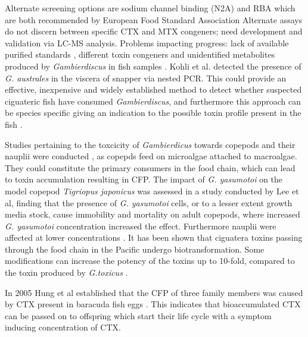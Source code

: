 Alternate screening options are sodium channel binding (N2A) \cite{dickey2010ciguatera} and RBA \cite{poli1997identification,darius2007ciguatera} which are both recommended by European Food Standard Association \cite{} %
Alternate assays do not discern between specific CTX and MTX congeners; need development and validation via LC-MS analysis. Problems impacting progress: lack of available purified standards \cite{}, different toxin congeners and unidentified metabolites produced by \emph{Gambierdiscus} in fish samples \cite{endean1993variation,vernoux1997isolation}.
Kohli et al. detected the presence of \emph{G. australes} in the viscera of snapper via nested PCR. This could provide an effective, inexpensive and widely established method to detect whether suspected ciguateric fish have consumed \emph{Gambierdiscus}, and furthermore this approach can be species specific giving an indication to the possible toxin profile present in the fish \cite{kohli2014feeding}. 

Studies pertaining to the toxcicity of \emph{Gambierdicus} towards copepods and their nauplii were conducted \cite{lee2014toxicity}, as copepds feed on microalgae attached to macroalgae. They could constitute the primary consumers in the food chain, which can lead to toxin accumulation \cite{raisuddin2007copepod} resulting in CFP. The impact of \emph{G. yasumotoi} on the model copepod \emph{Tigriopus japonicus} was assessed in a study conducted by Lee et al, finding that the presence of \emph{G. yasumotoi} cells, or to a lesser extent growth media stock, cause immobility and mortality on adult copepods, where increased \emph{G. yasumotoi} concentration increased the effect. Furthermore nauplii were affected at lower concentrations \cite{lee2014toxicity}.
It has been shown that ciguatera toxins passing through the food chain in the Pacific undergo biotransformation. Some modifications can increase the potency of the toxins up to 10-fold, compared to the toxin produced by \textit{G.toxicus} \cite{lewis2006ciguatera}.

In 2005 Hung et al established that the CFP of three family members was caused by CTX present in baracuda fish eggs \cite{hung2005persistent}. This indicates that bioaccumulated CTX can be passed on to offspring which start their life cycle with a symptom inducing concentration of CTX.


